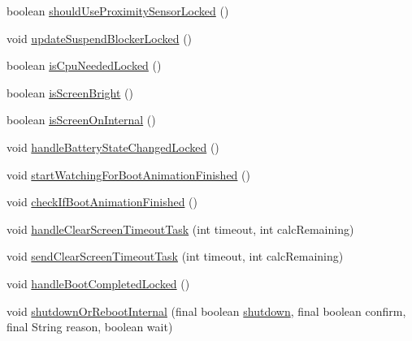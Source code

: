 \begin{DoxyCompactItemize}
boolean \hyperlink{classcom_1_1android_1_1server_1_1power_1_1PowerManagerService_a98db68dcd7bf77f8158451fc5478eb80}{should\-Use\-Proximity\-Sensor\-Locked} ()
\item 
void \hyperlink{classcom_1_1android_1_1server_1_1power_1_1PowerManagerService_afcf15f0aef53bda399443d8e29ba799c}{update\-Suspend\-Blocker\-Locked} ()
\item 
boolean \hyperlink{classcom_1_1android_1_1server_1_1power_1_1PowerManagerService_a33a8209e4cf120ddb296ebf809bcc843}{is\-Cpu\-Needed\-Locked} ()
\item 
boolean \hyperlink{classcom_1_1android_1_1server_1_1power_1_1PowerManagerService_ad7ea916625d782c4f2c458d9b964c68f}{is\-Screen\-Bright} ()
\item 
boolean \hyperlink{classcom_1_1android_1_1server_1_1power_1_1PowerManagerService_a2c6e49aa56bed839d366b749da9fbde8}{is\-Screen\-On\-Internal} ()
\item 
void \hyperlink{classcom_1_1android_1_1server_1_1power_1_1PowerManagerService_ad6d79c9037c63ee5443430697429d01a}{handle\-Battery\-State\-Changed\-Locked} ()
\item 
void \hyperlink{classcom_1_1android_1_1server_1_1power_1_1PowerManagerService_a193a63ec59546efe1a181f1edb99462c}{start\-Watching\-For\-Boot\-Animation\-Finished} ()
\item 
void \hyperlink{classcom_1_1android_1_1server_1_1power_1_1PowerManagerService_a6e6bee2d07f48c66f5eddb6247bce35a}{check\-If\-Boot\-Animation\-Finished} ()
\item 
void \hyperlink{classcom_1_1android_1_1server_1_1power_1_1PowerManagerService_a5e40ae78b0c7705435baecf75ba077e7}{handle\-Clear\-Screen\-Timeout\-Task} (int timeout, int calc\-Remaining)
\item 
void \hyperlink{classcom_1_1android_1_1server_1_1power_1_1PowerManagerService_ab436bac08404e11436eb930d6d976de9}{send\-Clear\-Screen\-Timeout\-Task} (int timeout, int calc\-Remaining)
\item 
void \hyperlink{classcom_1_1android_1_1server_1_1power_1_1PowerManagerService_a5ac6cc2d1dfb46da8cc1edf989f2870a}{handle\-Boot\-Completed\-Locked} ()
\item 
void \hyperlink{classcom_1_1android_1_1server_1_1power_1_1PowerManagerService_a571ede606824be1f6809211dae09f394}{shutdown\-Or\-Reboot\-Internal} (final boolean \hyperlink{classcom_1_1android_1_1server_1_1power_1_1PowerManagerService_a1ae14154de05bc246283fa01687e4fc8}{shutdown}, final boolean confirm, final String reason, boolean wait)
\item 

\end{DoxyCompactItemize}

